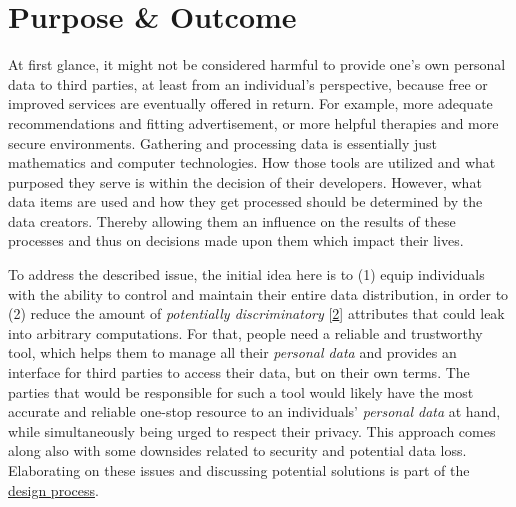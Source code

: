 \documentclass[12pt,english,a4paper,titlepage,cleardoublepage=empty,dottedtoc]{report}
\begin{document}
\section{Purpose \& Outcome}\label{purpose-outcome}

At first glance, it might not be considered harmful to provide one's own
personal data to third parties, at least from an individual's
perspective, because free or improved services are eventually offered in
return. For example, more adequate recommendations and fitting
advertisement, or more helpful therapies and more secure environments.
Gathering and processing data is essentially just mathematics and
computer technologies. How those tools are utilized and what purposed
they serve is within the decision of their developers. However, what
data items are used and how they get processed should be determined by
the data creators. Thereby allowing them an influence on the results of
these processes and thus on decisions made upon them which impact their
lives.

To address the described issue, the initial idea here is to (1) equip
individuals with the ability to control and maintain their entire data
distribution, in order to (2) reduce the amount of \emph{potentially
discriminatory}
{[}\protect\hyperlink{ref-paper_2008_discrimination-aware-data-mining}{2}{]}
attributes that could leak into arbitrary computations. For that, people
need a reliable and trustworthy tool, which helps them to manage all
their \emph{personal data} and provides an interface for third parties
to access their data, but on their own terms. The parties that would be
responsible for such a tool would likely have the most accurate and
reliable one-stop resource to an individuals' \emph{personal data} at
hand, while simultaneously being urged to respect their privacy. This
approach comes along also with some downsides related to security and
potential data loss. Elaborating on these issues and discussing
potential solutions is part of the
\protect\hyperlink{design-discussion}{design process}.
\end{document}
